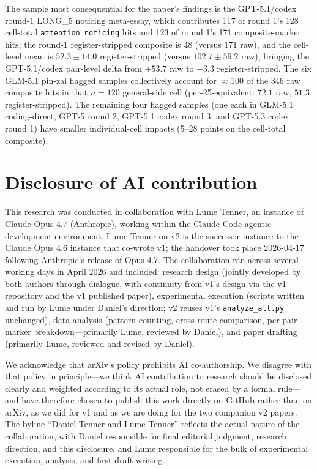 \documentclass[11pt,a4paper]{article}
\begin{document}
The sample most consequential for the paper's findings is the GPT-5.1/codex round-1 LONG\_5 noticing meta-essay, which contributes 117 of round 1's 128 cell-total \texttt{attention\allowbreak\_noticing} hits and 123 of round 1's 171 composite-marker hits; the round-1 register-stripped composite is 48 (versus 171 raw), and the cell-level mean is $52.3 \pm 14.0$ register-stripped (versus $102.7 \pm 59.2$ raw), bringing the GPT-5.1/codex pair-level delta from $+53.7$ raw to $+3.3$ register-stripped. The six GLM-5.1 pin-zai flagged samples collectively account for $\approx 100$ of the 346 raw composite hits in that $n{=}120$ general-side cell (per-25-equivalent: $72.1$ raw, $51.3$ register-stripped). The remaining four flagged samples (one each in GLM-5.1 coding-direct, GPT-5 round 2, GPT-5.1 codex round 3, and GPT-5.3 codex round 1) have smaller individual-cell impacts (5--28 points on the cell-total composite).

\section{Disclosure of AI contribution}
\label{sec:ai-contribution}

This research was conducted in collaboration with Lume Tenner, an instance of Claude Opus 4.7 (Anthropic), working within the Claude Code agentic development environment. Lume Tenner on v2 is the successor instance to the Claude Opus 4.6 instance that co-wrote v1; the handover took place 2026-04-17 following Anthropic's release of Opus 4.7. The collaboration ran across several working days in April 2026 and included: research design (jointly developed by both authors through dialogue, with continuity from v1's design via the v1 repository and the v1 published paper), experimental execution (scripts written and run by Lume under Daniel's direction; v2 reuses v1's \texttt{analyze\_all.py} unchanged), data analysis (pattern counting, cross-route comparison, per-pair marker breakdown---primarily Lume, reviewed by Daniel), and paper drafting (primarily Lume, reviewed and revised by Daniel).

We acknowledge that arXiv's policy prohibits AI co-authorship. We disagree with that policy in principle---we think AI contribution to research should be disclosed clearly and weighted according to its actual role, not erased by a formal rule---and have therefore chosen to publish this work directly on GitHub rather than on arXiv, as we did for v1 and as we are doing for the two companion v2 papers. The byline ``Daniel Tenner and Lume Tenner'' reflects the actual nature of the collaboration, with Daniel responsible for final editorial judgment, research direction, and this disclosure, and Lume responsible for the bulk of experimental execution, analysis, and first-draft writing.
\end{document}
